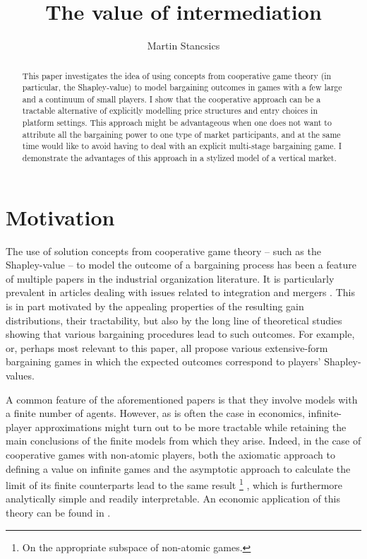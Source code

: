 \documentclass[a4paper]{article}
\title{The value of intermediation}
\author{Martin Stancsics}
\begin{document}
\maketitle

\begin{abstract}
    This paper investigates the idea of using concepts from cooperative game theory (in particular, the Shapley-value) to model bargaining outcomes in games with a few large and a continuum of small players.
    I show that the cooperative approach can be a tractable alternative of explicitly modelling price structures and entry choices in platform settings.
    This approach might be advantageous when one does not want to attribute all the bargaining power to one type of market participants, and at the same time would like to avoid having to deal with an explicit multi-stage bargaining game.
    I demonstrate the advantages of this approach in a stylized model of a vertical market.
\end{abstract}


\section{Motivation}

The use of solution concepts from cooperative game theory -- such as the Shapley-value -- to model the outcome of a bargaining process has been a feature of multiple papers in the industrial organization literature.
It is particularly prevalent in articles dealing with issues related to integration and mergers \parencite[e.g.][]{hart1990property,segal2003collusion,inderst2003bargaining,montez2007downstream}.
This is in part motivated by the appealing properties of the resulting gain distributions, their tractability, but also by the long line of theoretical studies showing that various bargaining procedures lead to such outcomes.
For example, \textcite{gul1989bargaining,winter1994demand,hart1996bargaining,inderst2003bargaining,} or, perhaps most relevant to this paper, \textcite{stole1996intra} all propose various extensive-form bargaining games in which the expected outcomes correspond to players' Shapley-values.

A common feature of the aforementioned papers is that they involve models with a finite number of agents.
However, as is often the case in economics, infinite-player approximations might turn out to be more tractable while retaining the main conclusions of the finite models from which they arise.
Indeed, in the case of cooperative games with non-atomic players, both the axiomatic approach to defining a value on infinite games and the asymptotic approach to calculate the limit of its finite counterparts lead to the same result \footnote{
    On the appropriate subspace of non-atomic games.
} \parencite{aumann2015values}, which is furthermore analytically simple and readily interpretable. An economic application of this theory can be found in \textcite{billera1978internal}.
\end{document}
